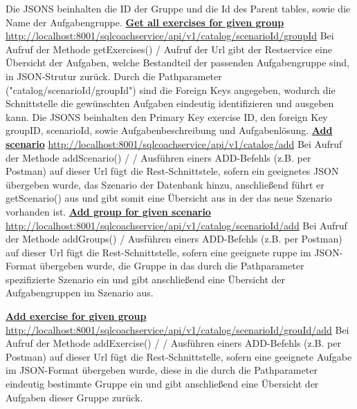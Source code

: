 \documentclass[fleqn,10pt,ngerman]{SelfArx}
\begin{document}
	Die JSONS beinhalten die ID der Gruppe und die Id des Parent tables, sowie die Name der Aufgabengruppe.
	\newline\newline
	\underline{\textbf{Get all exercises for given group}}\newline
	\underline{http://localhost:8001/sqlcoachservice/api/v1/catalog}\newline\underline{/{scenarioId}/{groupId}}\newline
	Bei Aufruf der Methode getExercises() / Aufruf der Url gibt der Restservice eine Übersicht der Aufgaben, welche Bestandteil der passenden Aufgabengruppe sind, in JSON-Strutur zurück.
	Durch die Pathparameter ("catalog/{scenarioId}/{groupId}") sind die Foreign Keys angegeben, wodurch die Schnittstelle die gewünschten Aufgaben eindeutig identifizieren und ausgeben kann.
	Die JSONS beinhalten den Primary Key exercise ID, den foreign Key groupID, scenarioId, sowie Aufgabenbeschreibung und Aufgabenlösung.
	\newline\newline
	\underline{\textbf{Add scenario}}\newline
	\underline{http://localhost:8001/sqlcoachservice/api/v1/catalog/add}\newline
	Bei Aufruf der Methode addScenario() / / Ausführen einers ADD-Befehls (z.B. per Postman) auf dieser Url  fügt die Rest-Schnittstele, sofern ein geeignetes JSON übergeben wurde, das Szenario der Datenbank hinzu, anschließend führt er getScenario() aus und gibt somit eine Übersicht aus in der das neue Szenario vorhanden ist.\newline\newline
		\underline{\textbf{Add group for given scenario}}\newline
	\noindent\underline{http://localhost:8001/sqlcoachservice/api/v1/catalog}\newline\underline{{/scenarioId}/add}\newline
	Bei Aufruf der Methode addGroups() / Ausführen einers ADD-Befehls (z.B. per Postman) auf dieser Url fügt die Rest-Schnittstelle, sofern eine geeignete ruppe im JSON-Format übergeben wurde, die Gruppe in das durch die Pathparameter spezifizierte Szenario ein und gibt anschließend eine Übersicht der Aufgabengruppen im Szenario aus.
	\newline\newline
	
	\noindent
	\underline{\textbf{Add exercise for given group}}\newline
	\underline{http://localhost:8001/sqlcoachservice/api/v1/catalog}\newline\underline{/{scenarioId}/{grouId}/add}\newline
	Bei Aufruf der Methode addExercise() / / Ausführen einers ADD-Befehls (z.B. per Postman)  auf dieser Url fügt die Rest-Schnittstelle, sofern eine geeignete Aufgabe im JSON-Format übergeben wurde, diese in die durch die Pathparameter eindeutig bestimmte Gruppe ein und gibt anschließend eine Übersicht der Aufgaben dieser Gruppe zurück.
	\newline\newline
	
\end{document}
